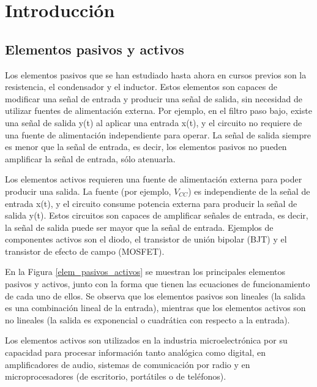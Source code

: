 \chapter{Introducción}

\section{Elementos pasivos y activos}

Los elementos pasivos que se han estudiado hasta ahora en cursos previos son la resistencia, el condensador y el inductor. Estos elementos son capaces de modificar una señal de entrada y producir una señal de salida, sin necesidad de utilizar fuentes de alimentación externa. Por ejemplo, en el filtro paso bajo, existe una señal de salida y(t) al aplicar una entrada x(t), y el circuito no requiere de una fuente de alimentación independiente para operar. La señal de salida siempre es menor que la señal de entrada, es decir, los elementos pasivos no pueden amplificar la señal de entrada, sólo atenuarla.

Los elementos activos requieren una fuente de alimentación externa para poder producir una salida. La fuente (por ejemplo, $V_{CC}$) es independiente de la señal de entrada x(t), y el circuito consume potencia externa para producir la señal de salida y(t). Estos circuitos son capaces de amplificar señales de entrada, es decir, la señal de salida puede ser mayor que la señal de entrada. Ejemplos de componentes activos son el diodo, el transistor de unión bipolar (BJT) y el transistor de efecto de campo (MOSFET).

En la Figura \ref{elem_pasivos_activos} se muestran los principales elementos pasivos y activos, junto con la forma que tienen las ecuaciones de funcionamiento de cada uno de ellos. Se observa que los elementos pasivos son lineales (la salida es una combinación lineal de la entrada), mientras que los elementos activos son no lineales (la salida es exponencial o cuadrática con respecto a la entrada).

Los elementos activos son utilizados en la industria microelectrónica por su capacidad para procesar información tanto analógica como digital, en amplificadores de audio, sistemas de comunicación por radio y en microprocesadores (de escritorio, portátiles o de teléfonos). 

